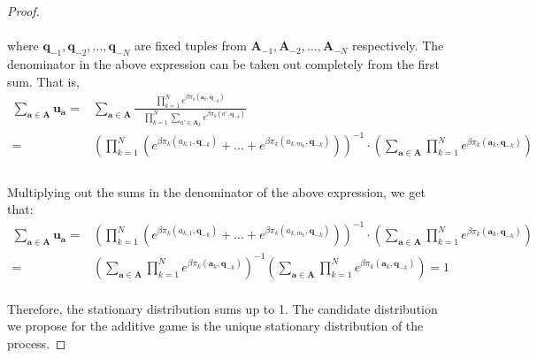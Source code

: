 \documentclass[11pt]{article}
\theoremstyle{plainCl1}
\theoremstyle{plainCl2}
\newcommand{\A}{\mathbf{A}}
\newcommand{\abf}{\mathbf{a}}
\newcommand{\qbf}{\mathbf{q}}
\newcommand{\ubf}{\mathbf{u}}
\begin{document}
\begin{proof}
\noindent \\ \\ where $\qbf_{-1}, \qbf_{-2},...,\qbf_{-N}$ are fixed tuples from $\A_{-1}, \A_{-2},...,\A_{-N}$ respectively. The denominator in the above expression can be taken out completely from the first sum. That is, \\
\begin{align}
\sum_{\abf \in \A} \ubf_\abf = &\sum_{\abf \in \A} \frac{\displaystyle \prod_{k=1}^N e^{\beta \pi_k(\abf_k, \qbf_{-k})}}{\displaystyle \quad \prod_{k=1}^N \sum_{a' \in \A_k} e^{\beta \pi_k(a',\qbf_{-k})}} \\[15pt]
=& \left( \displaystyle \prod_{k=1}^N \left( e^{\beta \pi_k(a_{k,1}, \qbf_{-k})}+... + e^{\beta \pi_k(a_{k,m_k}, \qbf_{-k})} \right) \right)^{-1} \cdot \left( \sum_{\abf \in \A} \displaystyle \prod_{k=1}^N e^{\beta \pi_k(\abf_k, \qbf_{-k})} \right) \\
\end{align} \\
\noindent Multiplying out the sums in the denominator of the above expression, we get that:
\begin{align}
\sum_{\abf \in \A} \ubf_\abf =& \left( \displaystyle \prod_{k=1}^N \left( e^{\beta \pi_k(a_{k,1}, \qbf_{-k})}+... + e^{\beta \pi_k(a_{k,m_k}, \qbf_{-k})} \right) \right)^{-1} \cdot \left( \sum_{\abf \in \A} \displaystyle \prod_{k=1}^N e^{\beta \pi_k(\abf_k, \qbf_{-k})} \right) \\[10pt]
=& \left( \sum_{\abf \in \A} \displaystyle \prod_{k=1}^N e^{\beta \pi_k(\abf_k, \qbf_{-k})}  \right)^{-1} \left( \sum_{\abf \in \A} \displaystyle \prod_{k=1}^N e^{\beta \pi_k(\abf_k, \qbf_{-k})}  \right) = 1
\end{align} \\ 
\noindent Therefore, the stationary distribution sums up to 1. The candidate distribution we propose for the additive game is the unique stationary distribution of the process.
\end{proof}
\end{document}
